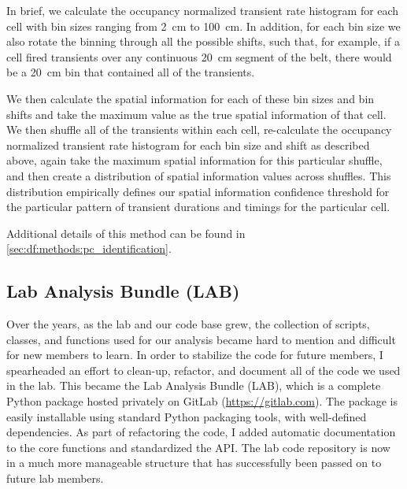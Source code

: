 In brief, we calculate the occupancy normalized transient rate histogram for each cell with bin sizes ranging from 2~cm to 100~cm.
In addition, for each bin size we also rotate the binning through all the possible shifts, such that, for example, if a cell fired transients over any continuous 20~cm segment of the belt, there would be a 20~cm bin that contained all of the transients.

We then calculate the spatial information for each of these bin sizes and bin shifts and take the maximum value as the true spatial information of that cell.
We then shuffle all of the transients within each cell, re-­calculate the occupancy normalized transient rate histogram for each bin size and shift as described above, again take the maximum spatial information for this particular shuffle, and then create a distribution of spatial information values across shuffles.
This distribution empirically defines our spatial information confidence threshold for the particular pattern of transient durations and timings for the particular cell.

Additional details of this method can be found in \autoref{sec:df:methods:pc_identification}.
 
\subsection{Lab Analysis Bundle (LAB)}
Over the years, as the lab and our code base grew, the collection of scripts, classes, and functions used for our analysis became hard to mention and difficult for new members to learn.
In order to stabilize the code for future members, I spearheaded an effort to clean-up, refactor, and document all of the code we used in the lab.
This became the Lab Analysis Bundle (LAB), which is a complete Python package hosted privately on GitLab (\url{https://gitlab.com}).
The package is easily installable using standard Python packaging tools, with well-defined dependencies.
As part of refactoring the code, I added automatic documentation to the core functions and standardized the API.
The lab code repository is now in a much more manageable structure that has successfully been passed on to future lab members.

